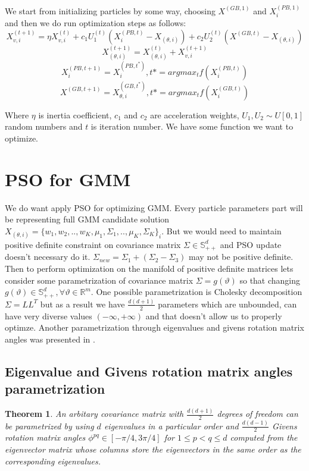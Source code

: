 \documentclass[a4paper]{article}
\newtheorem{theorem}{Theorem}
\begin{document}
We start from initializing particles by some way, choosing $X^{(GB, 1)}$ and $X^{(PB, 1)}_i$ and then we do run optimization steps as follows:
$$X_{v, i}^{(t+1)} = \eta X_{v, i}^{(t)} + c_1 U_1^{(t)}(X^{(PB, t)}_{i} - X_{(\theta, i)}) + c_2 U_2^{(t)}(X^{(GB, t)} - X_{(\theta, i)})$$
$$X_{(\theta , i)}^{(t+1)} = X_{(\theta , i)}^{(t)} + X_{v, i}^{(t+1)}$$
$$X^{(PB, t + 1)}_{i} = X^{(PB, t^*)}_{i},  t* = argmax_{t}f(X^{(PB, t)}_{i})$$
$$X^{(GB, t + 1)} = X^{(GB, t^*)}_{\theta, i},  t* = argmax_{t}f(X^{(GB, t)}_i)$$

Where $\eta$ is inertia coefficient, $c_1$ and $c_2$ are acceleration weights, $U_1, U_2 \sim U[0, 1]$ random numbers
 and $t$ is iteration number. 
We have some function we want to optimize.

\section{PSO for GMM}

We do want apply PSO for optimizing GMM. Every particle parameters part will be representing full GMM candidate solution
 $X_{(\theta, i)} = \{w_1, w_2, .., w_K, \mu_1, \Sigma_1, .., \mu_K, \Sigma_K\}_i$. 
 But we would need to maintain 
 positive definite constraint on covariance matrix $\Sigma \in \mathbb{S}^d_{++}$ and PSO update doesn't necessary do it.
 $\Sigma_{new} = \Sigma_1 + (\Sigma_2 - \Sigma_3)$ may not be positive definite. 
 Then to perform optimization on the manifold of positive definite matrices lets consider some parametrization
 of covariance matrix $\Sigma = g(\vartheta)$ so that changing $g(\vartheta) \in \mathbb{S}^d_{++}, \forall \vartheta \in \mathbb{R}^m$.
 One possible parametrization is Cholesky decomposition $\Sigma = LL^T$ but as a result we have $\frac{d(d+1)}{2}$ parameters which
 are unbounded, can have very diverse values $(-\infty, +\infty)$ and that doesn't allow us to properly optimze. Another parametrization through eigenvalues and givens rotation matrix angles 
 was presented in \cite{ARI20122804}.

 \subsection{Eigenvalue and Givens rotation matrix angles parametrization}

 \begin{theorem}
    An arbitary covariance matrix with $\frac{d(d+1)}{2}$ degrees of freedom can be parametrized by using $d$ eigenvalues in a particular order
    and $\frac{d(d-1)}{2}$ Givens rotation matrix angles $\phi^{pq} \in [-\pi/4, 3\pi/4]$ for $1 \leq p < q \leq d$ computed from the eigenvector matrix whose columns
    store the eigenvectors in the same order as the corresponding eigenvalues.
 \end{theorem}
\end{document}
